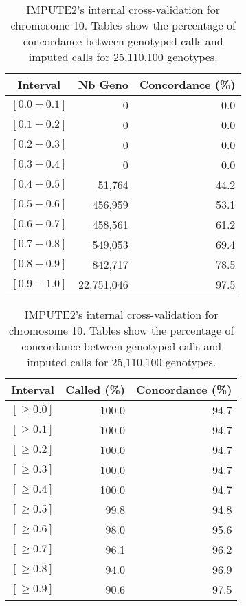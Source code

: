 \documentclass[10pt,twoside,english]{scrartcl}
\begin{document}
\begin{table}[H]
\protect\caption{IMPUTE2's internal cross-validation for chromosome 10. Tables show the
percentage of concordance between genotyped calls and imputed calls
for 25,110,100 genotypes.\label{tab:cross_validation_chr_10}}

\centering

\begin{tabular}{crr}
\hline 
\multicolumn{1}{c}{\textbf{Interval}}
 & \multicolumn{1}{c}{\textbf{Nb Geno}}
 & \multicolumn{1}{c}{\textbf{Concordance (\%)}}
\\
\hline 

$[0.0-0.1]$ & 0 & 0.0\\
$[0.1-0.2]$ & 0 & 0.0\\
$[0.2-0.3]$ & 0 & 0.0\\
$[0.3-0.4]$ & 0 & 0.0\\
$[0.4-0.5]$ & 51,764 & 44.2\\
$[0.5-0.6]$ & 456,959 & 53.1\\
$[0.6-0.7]$ & 458,561 & 61.2\\
$[0.7-0.8]$ & 549,053 & 69.4\\
$[0.8-0.9]$ & 842,717 & 78.5\\
$[0.9-1.0]$ & 22,751,046 & 97.5\\
\hline 
\end{tabular}
\hfill
\begin{tabular}{crr}
\hline 
\multicolumn{1}{c}{\textbf{Interval}}
 & \multicolumn{1}{c}{\textbf{Called (\%)}}
 & \multicolumn{1}{c}{\textbf{Concordance (\%)}}
\\
\hline 

$[\geq 0.0]$ & 100.0 & 94.7\\
$[\geq 0.1]$ & 100.0 & 94.7\\
$[\geq 0.2]$ & 100.0 & 94.7\\
$[\geq 0.3]$ & 100.0 & 94.7\\
$[\geq 0.4]$ & 100.0 & 94.7\\
$[\geq 0.5]$ & 99.8 & 94.8\\
$[\geq 0.6]$ & 98.0 & 95.6\\
$[\geq 0.7]$ & 96.1 & 96.2\\
$[\geq 0.8]$ & 94.0 & 96.9\\
$[\geq 0.9]$ & 90.6 & 97.5\\
\hline 
\end{tabular}


\end{table}
\end{document}
